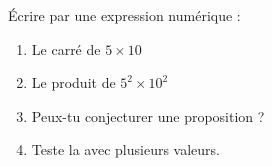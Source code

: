 
Écrire par une expression numérique :
\begin{enumerate}
\item Le carré de $5 \times 10$
\item Le produit de $5^2 \times 10^2$
\item Peux-tu conjecturer une proposition ?
\item Teste la avec plusieurs valeurs.
\end{enumerate}
